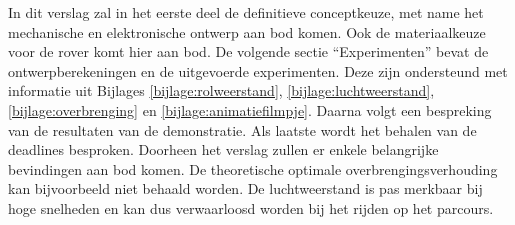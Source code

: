 In dit verslag zal in het eerste deel de definitieve conceptkeuze, met name het 
mechanische en elektronische ontwerp aan bod komen. Ook de materiaalkeuze voor 
de rover komt hier aan bod. De volgende sectie “Experimenten” bevat de 
ontwerpberekeningen en de uitgevoerde experimenten. Deze zijn ondersteund met 
informatie uit Bijlages \ref{bijlage:rolweerstand}, \ref{bijlage:luchtweerstand}, \ref{bijlage:overbrenging} en \ref{bijlage:animatiefilmpje}. Daarna volgt een bespreking van de resultaten 
van de demonstratie. Als laatste wordt het behalen van de deadlines besproken.
Doorheen het verslag zullen er enkele belangrijke bevindingen aan bod komen. De 
theoretische optimale overbrengingsverhouding kan bijvoorbeeld niet behaald 
worden. De luchtweerstand is pas merkbaar bij hoge snelheden en kan dus 
verwaarloosd worden bij het rijden op het parcours.  
